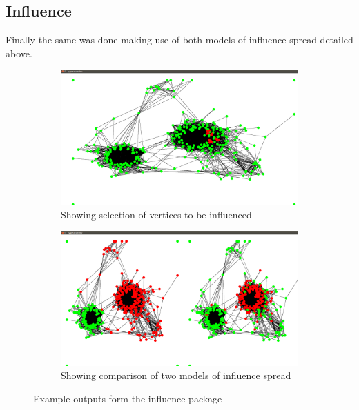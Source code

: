\documentclass[12pt,a4paper]{article}
\begin{document}
\subsection{Influence}
\noindent
Finally the same was done making use of both models of influence spread detailed above.

\begin{figure}[htb]
\centering
\captionsetup[subfigure]{justification=centering}
	\centering
	\begin{subfigure}[c]{0.4\linewidth}
	\caption{Showing selection of vertices to be influenced}
	\label{fig:influenceSelect}
	\includegraphics[scale=0.1]{Influence1.png}
	\end{subfigure}
\quad
	\begin{subfigure}[c]{0.4\linewidth}
	\centering
	\caption{Showing comparison of two models of influence spread}
	\label{fig:influenceCompare}
	\includegraphics[scale=0.1]{Influence3.png}
	\end{subfigure}
\caption{Example outputs form the influence package}
\label{fig:influence}
\end{figure}
\end{document}
